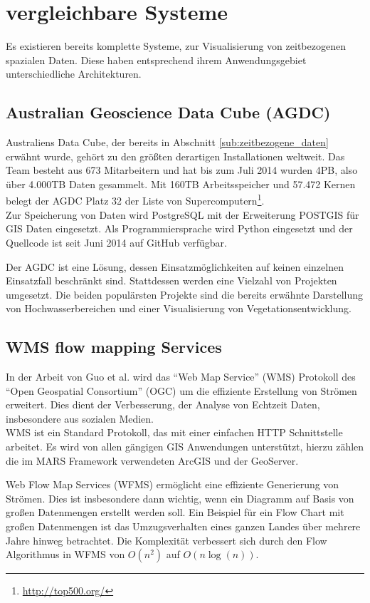 \documentclass[10pt,conference,compsocconf]{IEEEtran}
\begin{document}
\section{vergleichbare Systeme}
Es existieren bereits komplette Systeme, zur Visualisierung von zeitbezogenen spazialen Daten. Diese haben entsprechend ihrem Anwendungsgebiet unterschiedliche Architekturen.

\subsection{Australian Geoscience Data Cube (AGDC)}
Australiens Data Cube, der bereits in Abschnitt \ref{sub:zeitbezogene_daten} erwähnt wurde, gehört zu den größten derartigen Installationen weltweit. Das Team besteht aus 673 Mitarbeitern und hat bis zum Juli 2014 wurden 4PB, also über 4.000TB Daten gesammelt\cite{agdc}. Mit 160TB Arbeitsspeicher und 57.472 Kernen belegt der AGDC Platz 32 der Liste von Supercomputern\footnote{\url{http://top500.org/}}.\\
Zur Speicherung von Daten wird PostgreSQL mit der Erweiterung POSTGIS für GIS Daten eingesetzt. Als Programmiersprache wird Python eingesetzt und der Quellcode ist seit Juni 2014 auf GitHub verfügbar.\par

Der AGDC ist eine Lösung, dessen Einsatzmöglichkeiten auf keinen einzelnen Einsatzfall beschränkt sind. Stattdessen werden eine Vielzahl von Projekten umgesetzt. Die beiden populärsten Projekte sind die bereits erwähnte Darstellung von Hochwasserbereichen und einer Visualisierung von Vegetationsentwicklung\cite{agdc2}.

\subsection{WMS flow mapping Services}
In der Arbeit  von Guo et al.\cite{wms_flow_mapping} wird das \enquote{Web Map Service} (WMS) Protokoll des \enquote{Open Geospatial Consortium} (OGC) um die effiziente Erstellung von Strömen erweitert. Dies dient der Verbesserung, der Analyse von Echtzeit Daten, insbesondere aus sozialen Medien.\\
WMS ist ein Standard Protokoll, das mit einer einfachen HTTP Schnittstelle arbeitet. Es wird von allen gängigen GIS Anwendungen unterstützt, hierzu zählen die im MARS Framework verwendeten ArcGIS und der GeoServer.\par

Web Flow Map Services (WFMS) ermöglicht eine effiziente Generierung von Strömen. Dies ist insbesondere dann wichtig, wenn ein Diagramm auf Basis von großen Datenmengen erstellt werden soll. Ein Beispiel für ein Flow Chart mit großen Datenmengen ist das Umzugsverhalten eines ganzen Landes über mehrere Jahre hinweg betrachtet. Die Komplexität verbessert sich durch den Flow Algorithmus in WFMS von $O(n^2 )$ auf $O(n \log (n))$.\par
\end{document}
